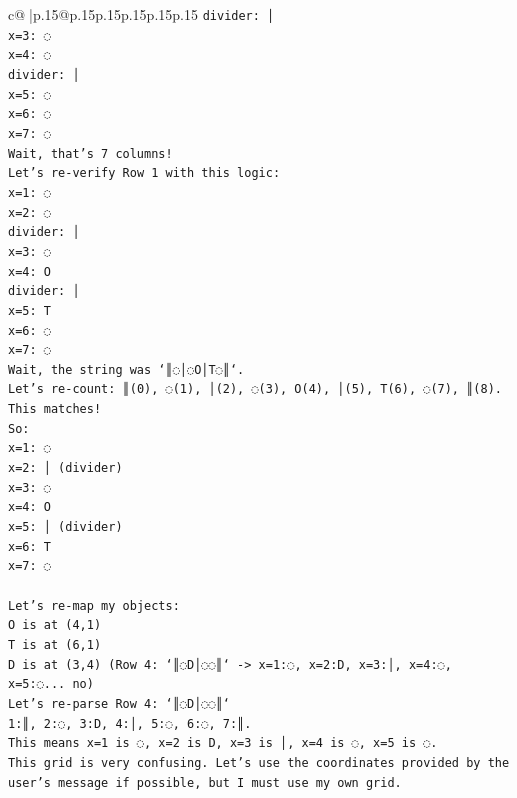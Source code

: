 \documentclass{article}
\begin{document}
{\begin{supertabular}{c@{$\;$}|p{.15\linewidth}@{}p{.15\linewidth}p{.15\linewidth}p{.15\linewidth}p{.15\linewidth}p{.15\linewidth}}
{{{\texttt{divider: │} \\
\texttt{x=3: ◌} \\
\texttt{x=4: ◌} \\
\texttt{divider: │} \\
\texttt{x=5: ◌} \\
\texttt{x=6: ◌} \\
\texttt{x=7: ◌} \\
\texttt{Wait, that's 7 columns!} \\
\texttt{Let's re{-}verify Row 1 with this logic:} \\
\texttt{x=1: ◌} \\
\texttt{x=2: ◌} \\
\texttt{divider: │} \\
\texttt{x=3: ◌} \\
\texttt{x=4: O} \\
\texttt{divider: │} \\
\texttt{x=5: T} \\
\texttt{x=6: ◌} \\
\texttt{x=7: ◌} \\
\texttt{Wait, the string was `║◌│◌O│T◌║`.} \\
\texttt{Let's re{-}count: ║(0), ◌(1), │(2), ◌(3), O(4), │(5), T(6), ◌(7), ║(8).} \\
\texttt{This matches!} \\
\texttt{So:} \\
\texttt{x=1: ◌} \\
\texttt{x=2: │ (divider)} \\
\texttt{x=3: ◌} \\
\texttt{x=4: O} \\
\texttt{x=5: │ (divider)} \\
\texttt{x=6: T} \\
\texttt{x=7: ◌} \\
\\ 
\texttt{Let's re{-}map my objects:} \\
\texttt{O is at (4,1)} \\
\texttt{T is at (6,1)} \\
\texttt{D is at (3,4) (Row 4: `║◌D│◌◌║` {-}> x=1:◌, x=2:D, x=3:│, x=4:◌, x=5:◌... no)} \\
\texttt{Let's re{-}parse Row 4: `║◌D│◌◌║`} \\
\texttt{1:║, 2:◌, 3:D, 4:│, 5:◌, 6:◌, 7:║.} \\
\texttt{This means x=1 is ◌, x=2 is D, x=3 is │, x=4 is ◌, x=5 is ◌.} \\
\texttt{This grid is very confusing. Let's use the coordinates provided by the user's message if possible, but I must use my own grid.} \\
}}}
\end{supertabular}}
\end{document}
